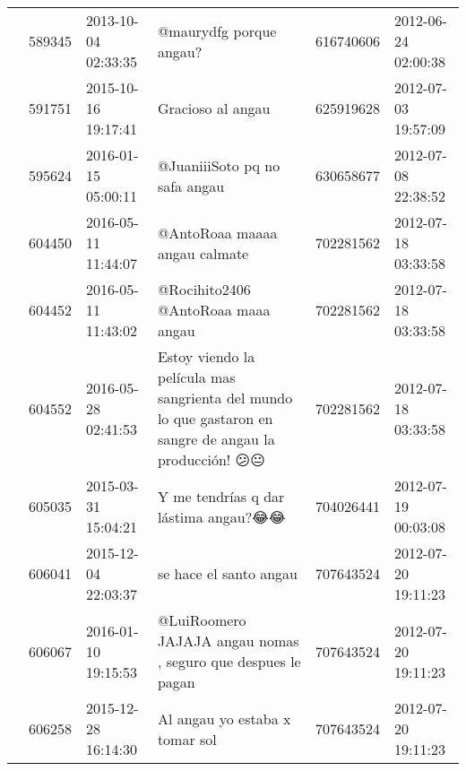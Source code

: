 \begin{tabular}{llllrl}
           & 589345  & 2013-10-04 02:33:35 &                                                                                                                      @maurydfg porque angau? &   616740606 & 2012-06-24 02:00:38 \\
           & 591751  & 2015-10-16 19:17:41 &                                                                                                                            Gracioso al angau &   625919628 & 2012-07-03 19:57:09 \\
           & 595624  & 2016-01-15 05:00:11 &                                                                                                                @JuaniiiSoto pq no safa angau &   630658677 & 2012-07-08 22:38:52 \\
           & 604450  & 2016-05-11 11:44:07 &                                                                                                                @AntoRoaa maaaa angau calmate &   702281562 & 2012-07-18 03:33:58 \\
           & 604452  & 2016-05-11 11:43:02 &                                                                                                           @Rocihito2406 @AntoRoaa maaa angau &   702281562 & 2012-07-18 03:33:58 \\
           & 604552  & 2016-05-28 02:41:53 &                                       Estoy viendo la película mas sangrienta del mundo lo que gastaron en sangre de angau la producción! 😕😐 &   702281562 & 2012-07-18 03:33:58 \\
           & 605035  & 2015-03-31 15:04:21 &                                                                                                         Y me tendrías q dar lástima angau?😂😂 &   704026441 & 2012-07-19 00:03:08 \\
           & 606041  & 2015-12-04 22:03:37 &                                                                                                                       se hace el santo angau &   707643524 & 2012-07-20 19:11:23 \\
           & 606067  & 2016-01-10 19:15:53 &                                                                                 @LuiRoomero JAJAJA angau nomas , seguro que despues le pagan &   707643524 & 2012-07-20 19:11:23 \\
           & 606258  & 2015-12-28 16:14:30 &                                                                                                              Al  angau yo estaba x tomar sol &   707643524 & 2012-07-20 19:11:23 \\

\end{tabular}
